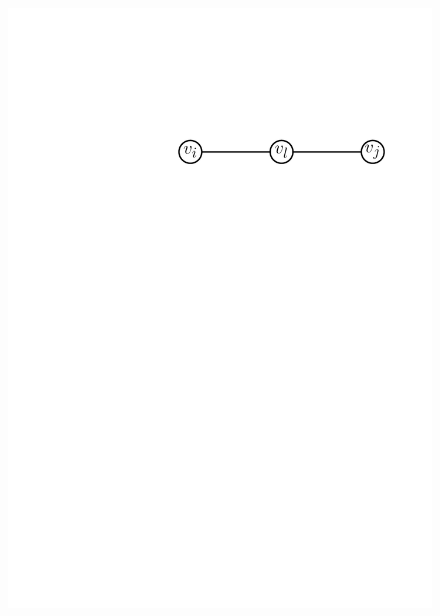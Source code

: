 \begin{figure}[htb]
{	\includegraphics[scale=.5]{01_graph_theory/pics/adjacency_k-2.pdf}
}
\end{figure}
